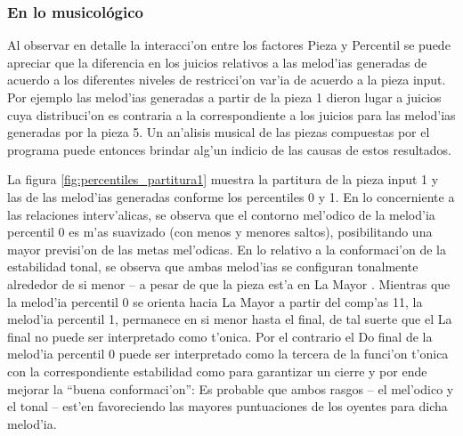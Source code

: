 \subsubsection{En lo musicol\'ogico}
\label{sec:exp_percentiles_anal_music}
Al observar en detalle la interacci'on entre los factores Pieza y Percentil se puede apreciar que la diferencia en los juicios relativos a las melod'ias generadas de 
acuerdo a los diferentes niveles de restricci'on var'ia de acuerdo a la pieza input. Por ejemplo las melod'ias generadas a partir de la pieza 1 dieron lugar a juicios 
cuya distribuci'on es contraria a la correspondiente a los juicios para las melod'ias generadas por la pieza 5. Un an'alisis musical de las piezas compuestas por el 
programa puede entonces brindar alg'un indicio de las causas de estos resultados.

\begin{imagen}
    \width{12cm}
\end{imagen}

La figura \ref{fig:percentiles_partitura1} muestra la partitura de la pieza input 1 y las de las melod'ias generadas conforme los percentiles 0 y 1. En lo concerniente a las relaciones interv'alicas, 
se observa que el contorno mel'odico de la melod'ia percentil 0 es m'as suavizado (con menos y menores saltos), posibilitando una mayor previsi'on de las metas mel'odicas. 
En lo relativo a la conformaci'on de la estabilidad tonal, se observa que ambas melod'ias se configuran tonalmente alrededor de si menor -- a pesar de que la pieza est'a en 
La Mayor . Mientras que la melod'ia percentil 0 se orienta hacia La Mayor a partir del comp'as 11, la melod'ia percentil 1, permanece en si menor hasta el final, de tal suerte
que el La final no puede ser interpretado como t'onica. Por el contrario el Do final de la melod'ia percentil 0 puede ser interpretado como la tercera de la funci'on t'onica 
con la correspondiente estabilidad como para garantizar un cierre y por ende mejorar la ``buena conformaci'on'': Es probable que ambos rasgos -- el mel'odico y el tonal -- est'en favoreciendo las mayores puntuaciones de los oyentes para dicha melod'ia.

\begin{imagen}
    \width{13cm}
\end{imagen}

